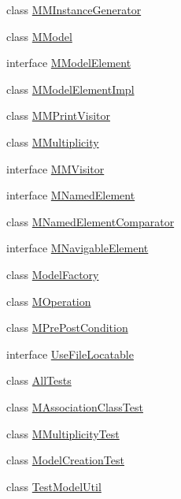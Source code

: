 \begin{DoxyCompactItemize}
\item 
class \hyperlink{classorg_1_1tzi_1_1use_1_1uml_1_1mm_1_1_m_m_instance_generator}{M\-M\-Instance\-Generator}
\item 
class \hyperlink{classorg_1_1tzi_1_1use_1_1uml_1_1mm_1_1_m_model}{M\-Model}
\item 
interface \hyperlink{interfaceorg_1_1tzi_1_1use_1_1uml_1_1mm_1_1_m_model_element}{M\-Model\-Element}
\item 
class \hyperlink{classorg_1_1tzi_1_1use_1_1uml_1_1mm_1_1_m_model_element_impl}{M\-Model\-Element\-Impl}
\item 
class \hyperlink{classorg_1_1tzi_1_1use_1_1uml_1_1mm_1_1_m_m_print_visitor}{M\-M\-Print\-Visitor}
\item 
class \hyperlink{classorg_1_1tzi_1_1use_1_1uml_1_1mm_1_1_m_multiplicity}{M\-Multiplicity}
\item 
interface \hyperlink{interfaceorg_1_1tzi_1_1use_1_1uml_1_1mm_1_1_m_m_visitor}{M\-M\-Visitor}
\item 
interface \hyperlink{interfaceorg_1_1tzi_1_1use_1_1uml_1_1mm_1_1_m_named_element}{M\-Named\-Element}
\item 
class \hyperlink{classorg_1_1tzi_1_1use_1_1uml_1_1mm_1_1_m_named_element_comparator}{M\-Named\-Element\-Comparator}
\item 
interface \hyperlink{interfaceorg_1_1tzi_1_1use_1_1uml_1_1mm_1_1_m_navigable_element}{M\-Navigable\-Element}
\item 
class \hyperlink{classorg_1_1tzi_1_1use_1_1uml_1_1mm_1_1_model_factory}{Model\-Factory}
\item 
class \hyperlink{classorg_1_1tzi_1_1use_1_1uml_1_1mm_1_1_m_operation}{M\-Operation}
\item 
class \hyperlink{classorg_1_1tzi_1_1use_1_1uml_1_1mm_1_1_m_pre_post_condition}{M\-Pre\-Post\-Condition}
\item 
interface \hyperlink{interfaceorg_1_1tzi_1_1use_1_1uml_1_1mm_1_1_use_file_locatable}{Use\-File\-Locatable}
\item 
class \hyperlink{classorg_1_1tzi_1_1use_1_1uml_1_1mm_1_1_all_tests}{All\-Tests}
\item 
class \hyperlink{classorg_1_1tzi_1_1use_1_1uml_1_1mm_1_1_m_association_class_test}{M\-Association\-Class\-Test}
\item 
class \hyperlink{classorg_1_1tzi_1_1use_1_1uml_1_1mm_1_1_m_multiplicity_test}{M\-Multiplicity\-Test}
\item 
class \hyperlink{classorg_1_1tzi_1_1use_1_1uml_1_1mm_1_1_model_creation_test}{Model\-Creation\-Test}
\item 
class \hyperlink{classorg_1_1tzi_1_1use_1_1uml_1_1mm_1_1_test_model_util}{Test\-Model\-Util}
\end{DoxyCompactItemize}

